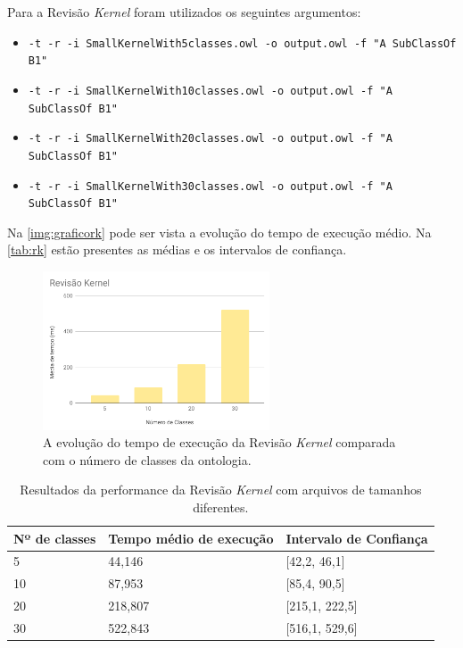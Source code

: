 Para a Revisão \textit{Kernel} foram utilizados os seguintes argumentos:

\begin{itemize}
	\item \texttt{-t -r -i SmallKernelWith5classes.owl -o output.owl -f "A SubClassOf B1"}
	\item \texttt{-t -r -i SmallKernelWith10classes.owl -o output.owl -f "A SubClassOf B1"}
	\item \texttt{-t -r -i SmallKernelWith20classes.owl -o output.owl -f "A SubClassOf B1"}
	\item \texttt{-t -r -i SmallKernelWith30classes.owl -o output.owl -f "A SubClassOf B1"}
\end{itemize}

Na \autoref{img:graficork} pode ser vista a evolução do tempo de execução médio. Na \autoref{tab:rk} estão presentes as médias e os intervalos de confiança.

\begin{figure}[H]
	\centering
	\includegraphics[width=0.6\textwidth]{Capitulos/Testes/graficork.png}
	\caption{A evolução do tempo de execução da Revisão \textit{Kernel} comparada com o número de classes da ontologia.}
	\label{img:graficork}
\end{figure}

\begin{table}[H]
	\centering
	\begin{tabular}{|l|l|l|}
		\hline
		\textbf{Nº de classes}  & \textbf{Tempo médio de execução} & \textbf{Intervalo de Confiança} \\ \hline
		5                                                  & 44,146                          & {[}42,2, 46,1{]}              \\ \hline
		10                                                  & 87,953                          & {[}85,4, 90,5{]}              \\ \hline
		20                                                  & 218,807                          & {[}215,1, 222,5{]}              \\ \hline
		30                                                 & 522,843                          & {[}516,1, 529,6{]}              \\ \hline
	\end{tabular}
	\caption{Resultados da performance da Revisão \textit{Kernel} com arquivos de tamanhos diferentes.}
	\label{tab:rk}
\end{table}

